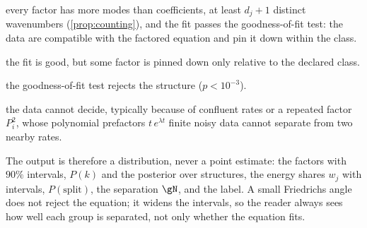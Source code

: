 \begin{description}[leftmargin=7.6em,labelwidth=7.1em,labelsep=0.5em,itemsep=2pt,topsep=4pt,font=\normalfont]
\item[\FC] every factor has more modes than coefficients, at least $d_j+1$ distinct wavenumbers (\cref{prop:counting}), and
the fit passes the goodness-of-fit test: the data are compatible with the factored equation and pin it down within the class.
\item[\IDK] the fit is good, but some factor is pinned down only relative to the declared class.
\item[\MIS] the goodness-of-fit test rejects the structure ($p<10^{-3}$).
\item[\UND] the data cannot decide, typically because of confluent rates or a repeated factor $P_i^2$, whose polynomial
prefactors $t\,e^{\lambda t}$ finite noisy data cannot separate from two nearby rates.
\end{description}

\noindent The output is therefore a distribution, never a point estimate: the factors with $90\%$ intervals, $P(k)$ and
the posterior over structures, the energy shares $w_j$ with intervals, $P(\text{split})$, the separation $\gN$, and the
label. A small Friedrichs angle does not reject the equation; it widens the intervals, so the reader always sees how well
each group is separated, not only whether the equation fits.

